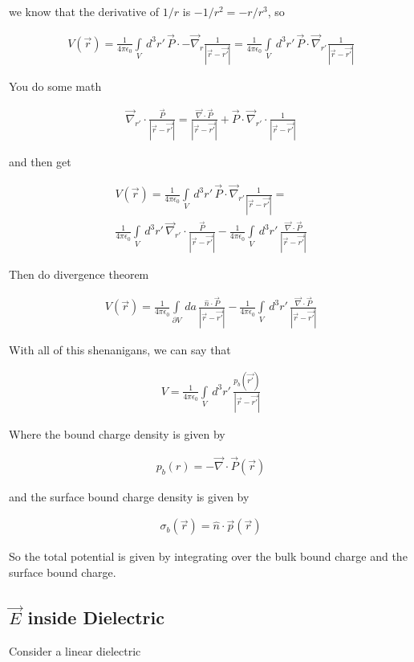 \documentclass[fleqn]{report}
\newcommand{\del}{\partial}
\newcommand{\equations} [1] {
\begin{gather*}
#1
\end{gather*}
}
\begin{document}
we know that the derivative of $1/r$ is $-1/r^2 = -r/r^3$, so 

\equations{
    V(\vec r) = 
    \frac{1}{4 \pi \epsilon_0}
    \int\limits_{V} \, d^3 r' \, 
    \vec P
    \cdot 
    -\vec \nabla_r
    \frac{1 }{|\vec r - \vec{r'}|}
    =
    \frac{1}{4 \pi \epsilon_0} 
    \int\limits_{V} \, d^3 r' \, 
    \vec P
    \cdot 
    \vec \nabla_{r'}
    \frac{1 }{|\vec r - \vec{r'}|}
}

You do some math 
\equations{
    \vec \nabla_{r'}
    \cdot 
    \frac{\vec P }{|\vec r - \vec{r'}|}
    =
    \frac{\vec \nabla \cdot \vec P }{|\vec r - \vec{r'}|}
    +
    \vec P
    \cdot 
    \vec \nabla_{r'}
    \cdot 
    \frac{1 }{|\vec r - \vec{r'}|}
}

and then get 
\equations{
    V(\vec r)
    =
    \frac{1}{4 \pi \epsilon_0} 
    \int\limits_{V} \, d^3 r' \, 
    \vec P
    \cdot 
    \vec \nabla_{r'}
    \frac{1 }{|\vec r - \vec{r'}|}
    =
    \\
    \frac{1}{4 \pi \epsilon_0} 
    \int\limits_{V} \, d^3 r' \, 
    \vec \nabla_{r'}
    \cdot 
    \frac{\vec P }{|\vec r - \vec{r'}|}
    -
    \frac{1}{4 \pi \epsilon_0} 
    \int\limits_{V} \, d^3 r' \, 
    \frac{\vec \nabla \cdot \vec P }{|\vec r - \vec{r'}|}
}

Then do divergence theorem 

\equations{
    V(\vec r)
    =
    \frac{1}{4 \pi \epsilon_0} 
    \int\limits_{\del V} \, d a \, 
    \frac{\hat n \cdot \vec P }{|\vec r - \vec{r'}|}
    -
    \frac{1}{4 \pi \epsilon_0} 
    \int\limits_{V} \, d^3 r' \, 
    \frac{\vec \nabla \cdot \vec P }{|\vec r - \vec{r'}|}
}

With all of this shenanigans, we can say that 
\equations{
    V 
    =
    \frac{1}{4 \pi \epsilon_0}
    \int\limits_V \, d^3 r' \, 
    \frac{p_b(\vec{r'})}{|\vec r - \vec{r'}|}
}

Where the bound charge density is given by 
\equations{
    p_b(r) = - \vec \nabla \cdot \vec P(\vec r)
}

and the surface bound charge density is given by 
\equations{
    \sigma_b(\vec r)
    =
    \hat n \cdot \vec p(\vec r)
}

So the total potential is given by integrating over the bulk bound charge 
and the surface bound charge. 

\subsection{$\vec E$ inside Dielectric}
Consider a linear dielectric 
\end{document}
